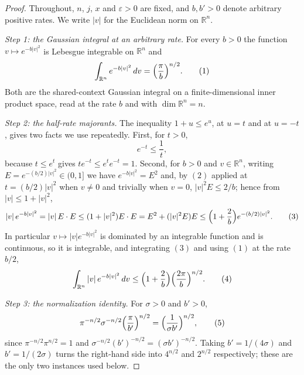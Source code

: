 \begin{proof}
Throughout, $n$, $j$, $x$ and $\varepsilon > 0$ are fixed, and $b, b' > 0$ denote
arbitrary positive rates.  We write $|v|$ for the Euclidean norm on
$\mathbb{R}^n$.

\emph{Step 1: the Gaussian integral at an arbitrary rate.}
For every $b > 0$ the function $v \mapsto e^{-b|v|^2}$ is Lebesgue integrable on
$\mathbb{R}^n$ and
\begin{equation*}
  \int_{\mathbb{R}^n} e^{-b|v|^2}\,dv = \Bigl(\frac{\pi}{b}\Bigr)^{n/2} .
  \tag{1}
\end{equation*}
Both are the shared-context Gaussian integral on a finite-dimensional inner
product space, read at the rate $b$ and with $\dim\mathbb{R}^n = n$.

\emph{Step 2: the half-rate majorants.}
The inequality $1+u \leq e^u$, at $u = t$ and at $u = -t$, gives two facts we use
repeatedly.  First, for $t > 0$,
\begin{equation*}
  e^{-t} \leq \frac1t ,
  \tag{2}
\end{equation*}
because $t \leq e^t$ gives $te^{-t} \leq e^te^{-t} = 1$.  Second, for $b > 0$ and
$v \in \mathbb{R}^n$, writing $E = e^{-(b/2)|v|^2} \in (0,1]$ we have
$e^{-b|v|^2} = E^2$ and, by $(2)$ applied at $t = (b/2)|v|^2$ when $v \neq 0$ and
trivially when $v = 0$, $|v|^2E \leq 2/b$; hence from
$|v| \leq 1 + |v|^2$,
\begin{equation*}
  |v|\,e^{-b|v|^2} = |v|\,E\cdot E \leq (1+|v|^2)E\cdot E
    = E^2 + (|v|^2E)E \leq \Bigl(1+\frac2b\Bigr)e^{-(b/2)|v|^2} .
  \tag{3}
\end{equation*}
In particular $v \mapsto |v|e^{-b|v|^2}$ is dominated by an integrable function
and is continuous, so it is integrable, and integrating $(3)$ and using $(1)$ at
the rate $b/2$,
\begin{equation*}
  \int_{\mathbb{R}^n} |v|\,e^{-b|v|^2}\,dv
    \leq \Bigl(1+\frac2b\Bigr)\Bigl(\frac{2\pi}{b}\Bigr)^{n/2} .
  \tag{4}
\end{equation*}

\emph{Step 3: the normalization identity.}
For $\sigma > 0$ and $b' > 0$,
\begin{equation*}
  \pi^{-n/2}\sigma^{-n/2}\Bigl(\frac{\pi}{b'}\Bigr)^{n/2}
    = \Bigl(\frac{1}{\sigma b'}\Bigr)^{n/2} ,
  \tag{5}
\end{equation*}
since $\pi^{-n/2}\pi^{n/2} = 1$ and
$\sigma^{-n/2}(b')^{-n/2} = (\sigma b')^{-n/2}$.  Taking $b' = 1/(4\sigma)$ and
$b' = 1/(2\sigma)$ turns the right-hand side into $4^{n/2}$ and $2^{n/2}$
respectively; these are the only two instances used below.


\end{proof}
